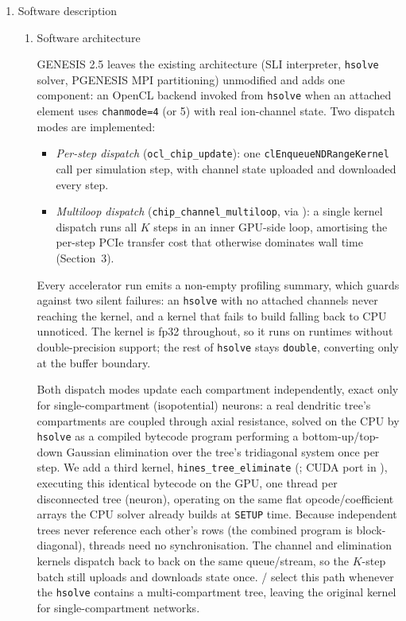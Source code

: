 \documentclass[preprint,12pt, a4paper]{elsarticle}
\newcommand{\hte}{\texttt{hines\_\allowbreak tree\_\allowbreak eliminate}}
\newcommand{\ccm}{\texttt{chip\_\allowbreak channel\_\allowbreak multiloop}}
\begin{document}
\begin{enumerate}
We name this release ``2.5'' rather than ``3.0'' deliberately: ``GENESIS 3''~\cite{g3_dev_plans} produced independent successor lines (Neurospaces/Heccer~\cite{cornelis2011}, MOOSE) evolving into the CBI federation~\cite{cornelis2008cbi,cornelis2007dendrite,cornelis2013interop}, not a single artifact comparable to GENESIS 2.4. This release is not a re-architecture.

\item Software description

\begin{enumerate}
  \item Software architecture

  GENESIS 2.5 leaves the existing architecture (SLI interpreter, \texttt{hsolve} solver, PGENESIS MPI partitioning) unmodified and adds one component: an OpenCL backend invoked from \texttt{hsolve} when an attached element uses \texttt{chanmode=4} (or 5) with real ion-channel state. Two dispatch modes are implemented:
  \begin{itemize}
    \item \emph{Per-step dispatch} (\texttt{ocl\_chip\_update}): one {\small\texttt{clEnqueue\allowbreak NDRange\allowbreak Kernel}} call per simulation step, with channel state uploaded and downloaded every step.
    \item \emph{Multiloop dispatch} (\ccm{}, via ): a single kernel dispatch runs all $K$ steps in an inner GPU-side loop, amortising the per-step PCIe transfer cost that otherwise dominates wall time (Section~3).
  \end{itemize}
  Every accelerator run emits a non-empty profiling summary, which guards against two silent failures: an \texttt{hsolve} with no attached channels never reaching the kernel, and a kernel that fails to build falling back to CPU unnoticed. The kernel is fp32 throughout, so it runs on runtimes without double-precision support; the rest of \texttt{hsolve} stays \texttt{double}, converting only at the buffer boundary.

  Both dispatch modes update each compartment independently, exact only for single-compartment (isopotential) neurons: a real dendritic tree's compartments are coupled through axial resistance, solved on the CPU by \texttt{hsolve} as a compiled bytecode program performing a bottom-up/top-down Gaussian elimination over the tree's tridiagonal system once per step. We add a third kernel, \hte{} (; CUDA port in ), executing this identical bytecode on the GPU, one thread per disconnected tree (neuron), operating on the same flat opcode/coefficient arrays the CPU solver already builds at \texttt{SETUP} time. Because independent trees never reference each other's rows (the combined program is block-diagonal), threads need no synchronisation. The channel and elimination kernels dispatch back to back on the same queue/stream, so the $K$-step batch still uploads and downloads state once. / select this path whenever the \texttt{hsolve} contains a multi-compartment tree, leaving the original kernel for single-compartment networks.


\end{enumerate}
\end{enumerate}
\end{document}
